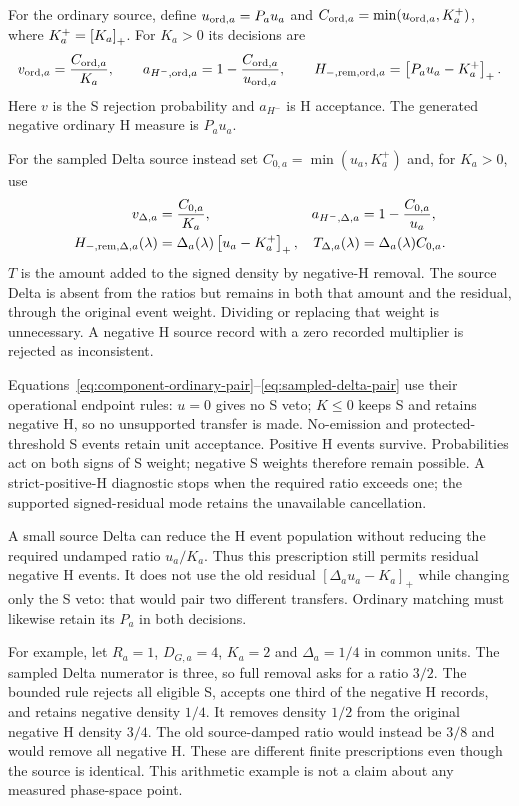 For the ordinary source, define
$u_{{\rm ord},a}=P_au_a$ and
$C_{{\rm ord},a}=\min(u_{{\rm ord},a},K_a^+)$, where $K_a^+=\left[K_a\right]_+$.
For $K_a>0$ its decisions are
\begin{equation}
 v_{{\rm ord},a}=\frac{C_{{\rm ord},a}}{K_a},\qquad
 a_{H^-,{\rm ord},a}
    =1-\frac{C_{{\rm ord},a}}{u_{{\rm ord},a}},\qquad
 H_{-,{\rm rem},{\rm ord},a}=\left[P_au_a-K_a^+\right]_+.
 \label{eq:component-ordinary-pair}
\end{equation}
Here $v$ is the S rejection probability and $a_{H^-}$ is H acceptance.
The generated negative ordinary H measure is $P_au_a$.

For the sampled Delta source instead set
$C_{0,a}=\min(u_a,K_a^+)$ and, for $K_a>0$, use
\begin{align}
 v_{\Delta,a}&=\frac{C_{0,a}}{K_a}, &
 a_{H^-,\Delta,a}&=1-\frac{C_{0,a}}{u_a},\nonumber\\
 H_{-,{\rm rem},\Delta,a}(\lambda)
   &=\Delta_a(\lambda)\left[u_a-K_a^+\right]_+, &
 T_{\Delta,a}(\lambda)&=\Delta_a(\lambda)C_{0,a}.
 \label{eq:sampled-delta-pair}
\end{align}
$T$ is the amount added to the signed density by negative-H removal.
The source Delta is absent from the ratios but remains in both that
amount and the residual, through the original event weight. Dividing
or replacing that weight is unnecessary. A negative H source record
with a zero recorded multiplier is rejected as inconsistent.

Equations~\eqref{eq:component-ordinary-pair}--\eqref{eq:sampled-delta-pair}
use their operational endpoint rules: $u=0$ gives no S veto; $K\leq0$
keeps S and retains negative H, so no unsupported transfer is made.
No-emission and protected-threshold S events retain unit acceptance.
Positive H events survive. Probabilities act on both signs of S weight;
negative S weights therefore remain possible.
A strict-positive-H diagnostic stops when the required ratio exceeds one;
the supported signed-residual mode retains the unavailable cancellation.

A small source Delta can reduce the H event population without reducing
the required undamped ratio $u_a/K_a$. Thus this prescription still
permits residual negative H events. It does not use the old residual
$[\Delta_a u_a-K_a]_+$ while changing only the S veto: that would pair
two different transfers. Ordinary matching must likewise retain its
$P_a$ in both decisions.

For example, let $R_a=1$, $D_{G,a}=4$, $K_a=2$ and
$\Delta_a=1/4$ in common units. The sampled Delta numerator is three,
so full removal asks for a ratio $3/2$. The bounded rule rejects all
eligible S, accepts one third of the negative H records, and retains
negative density $1/4$. It removes density $1/2$ from the original
negative H density $3/4$. The old source-damped ratio would instead
be $3/8$ and would remove all negative H. These are different finite
prescriptions even though the source is identical. This arithmetic
example is not a claim about any measured phase-space point.

